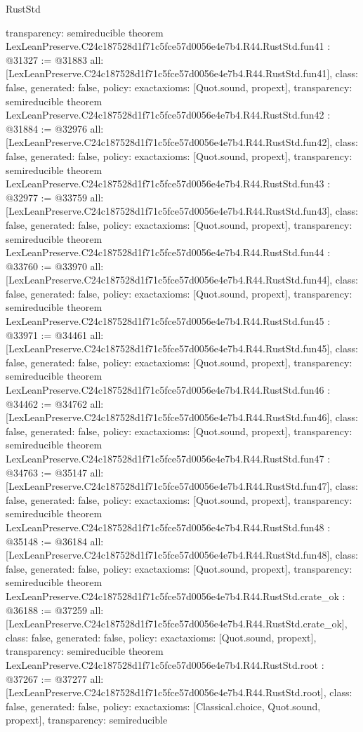 \begin{lexlean}{RustStd}
\begin{coremodule}
{  transparency: semireducible
}
theorem LexLeanPreserve.C24c187528d1f71c5fce57d0056e4e7b4.R44.RustStd.fun41 : @31327 := @31883 {
  all: [LexLeanPreserve.C24c187528d1f71c5fce57d0056e4e7b4.R44.RustStd.fun41],
  class: false,
  generated: false,
  policy: exact{axioms: [Quot.sound, propext]},
  transparency: semireducible
}
theorem LexLeanPreserve.C24c187528d1f71c5fce57d0056e4e7b4.R44.RustStd.fun42 : @31884 := @32976 {
  all: [LexLeanPreserve.C24c187528d1f71c5fce57d0056e4e7b4.R44.RustStd.fun42],
  class: false,
  generated: false,
  policy: exact{axioms: [Quot.sound, propext]},
  transparency: semireducible
}
theorem LexLeanPreserve.C24c187528d1f71c5fce57d0056e4e7b4.R44.RustStd.fun43 : @32977 := @33759 {
  all: [LexLeanPreserve.C24c187528d1f71c5fce57d0056e4e7b4.R44.RustStd.fun43],
  class: false,
  generated: false,
  policy: exact{axioms: [Quot.sound, propext]},
  transparency: semireducible
}
theorem LexLeanPreserve.C24c187528d1f71c5fce57d0056e4e7b4.R44.RustStd.fun44 : @33760 := @33970 {
  all: [LexLeanPreserve.C24c187528d1f71c5fce57d0056e4e7b4.R44.RustStd.fun44],
  class: false,
  generated: false,
  policy: exact{axioms: [Quot.sound, propext]},
  transparency: semireducible
}
theorem LexLeanPreserve.C24c187528d1f71c5fce57d0056e4e7b4.R44.RustStd.fun45 : @33971 := @34461 {
  all: [LexLeanPreserve.C24c187528d1f71c5fce57d0056e4e7b4.R44.RustStd.fun45],
  class: false,
  generated: false,
  policy: exact{axioms: [Quot.sound, propext]},
  transparency: semireducible
}
theorem LexLeanPreserve.C24c187528d1f71c5fce57d0056e4e7b4.R44.RustStd.fun46 : @34462 := @34762 {
  all: [LexLeanPreserve.C24c187528d1f71c5fce57d0056e4e7b4.R44.RustStd.fun46],
  class: false,
  generated: false,
  policy: exact{axioms: [Quot.sound, propext]},
  transparency: semireducible
}
theorem LexLeanPreserve.C24c187528d1f71c5fce57d0056e4e7b4.R44.RustStd.fun47 : @34763 := @35147 {
  all: [LexLeanPreserve.C24c187528d1f71c5fce57d0056e4e7b4.R44.RustStd.fun47],
  class: false,
  generated: false,
  policy: exact{axioms: [Quot.sound, propext]},
  transparency: semireducible
}
theorem LexLeanPreserve.C24c187528d1f71c5fce57d0056e4e7b4.R44.RustStd.fun48 : @35148 := @36184 {
  all: [LexLeanPreserve.C24c187528d1f71c5fce57d0056e4e7b4.R44.RustStd.fun48],
  class: false,
  generated: false,
  policy: exact{axioms: [Quot.sound, propext]},
  transparency: semireducible
}
theorem LexLeanPreserve.C24c187528d1f71c5fce57d0056e4e7b4.R44.RustStd.crate_ok : @36188 := @37259 {
  all: [LexLeanPreserve.C24c187528d1f71c5fce57d0056e4e7b4.R44.RustStd.crate_ok],
  class: false,
  generated: false,
  policy: exact{axioms: [Quot.sound, propext]},
  transparency: semireducible
}
theorem LexLeanPreserve.C24c187528d1f71c5fce57d0056e4e7b4.R44.RustStd.root : @37267 := @37277 {
  all: [LexLeanPreserve.C24c187528d1f71c5fce57d0056e4e7b4.R44.RustStd.root],
  class: false,
  generated: false,
  policy: exact{axioms: [Classical.choice, Quot.sound, propext]},
  transparency: semireducible
}


\end{coremodule}
\end{lexlean}
